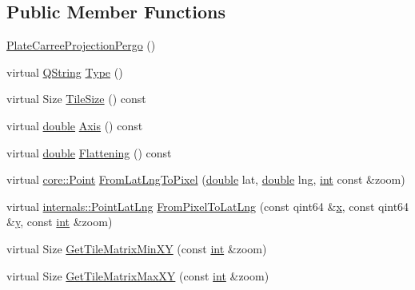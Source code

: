 \subsection*{Public Member Functions}
\begin{DoxyCompactItemize}
\item 
\hyperlink{group___o_p_map_widget_ga9efefe0ffe073b3074b5ada1a6f0f267}{Plate\-Carree\-Projection\-Pergo} ()
\item 
virtual \hyperlink{group___u_a_v_objects_plugin_gab9d252f49c333c94a72f97ce3105a32d}{Q\-String} \hyperlink{group___o_p_map_widget_ga0c0b83ba2e36423002e0561797a75d6f}{Type} ()
\item 
virtual Size \hyperlink{group___o_p_map_widget_ga459271797b70ca4aacc1bc616c8588e1}{Tile\-Size} () const 
\item 
virtual \hyperlink{_super_l_u_support_8h_a8956b2b9f49bf918deed98379d159ca7}{double} \hyperlink{group___o_p_map_widget_ga189bc30528175596e1010dae2d199d1d}{Axis} () const 
\item 
virtual \hyperlink{_super_l_u_support_8h_a8956b2b9f49bf918deed98379d159ca7}{double} \hyperlink{group___o_p_map_widget_ga03c9086ef72e6a349a5ab125cfd6533e}{Flattening} () const 
\item 
virtual \hyperlink{structcore_1_1_point}{core\-::\-Point} \hyperlink{group___o_p_map_widget_gaf785f752ac316a8cb94c96dacabdc244}{From\-Lat\-Lng\-To\-Pixel} (\hyperlink{_super_l_u_support_8h_a8956b2b9f49bf918deed98379d159ca7}{double} lat, \hyperlink{_super_l_u_support_8h_a8956b2b9f49bf918deed98379d159ca7}{double} lng, \hyperlink{ioapi_8h_a787fa3cf048117ba7123753c1e74fcd6}{int} const \&zoom)
\item 
virtual \hyperlink{structinternals_1_1_point_lat_lng}{internals\-::\-Point\-Lat\-Lng} \hyperlink{group___o_p_map_widget_ga3bd1d9693dd54a69baa88bed4785311d}{From\-Pixel\-To\-Lat\-Lng} (const qint64 \&\hyperlink{glext_8h_a1db9d104e3c2128177f26aff7b46982f}{x}, const qint64 \&\hyperlink{glext_8h_a42315f3ed8fff752bb47fd782309fcfc}{y}, const \hyperlink{ioapi_8h_a787fa3cf048117ba7123753c1e74fcd6}{int} \&zoom)
\item 
virtual Size \hyperlink{group___o_p_map_widget_ga95a4e9e98cce1bb7cc3d4afb9e30f1b7}{Get\-Tile\-Matrix\-Min\-X\-Y} (const \hyperlink{ioapi_8h_a787fa3cf048117ba7123753c1e74fcd6}{int} \&zoom)
\item 
virtual Size \hyperlink{group___o_p_map_widget_gabf54183dc66f5385ffa794ce7120629c}{Get\-Tile\-Matrix\-Max\-X\-Y} (const \hyperlink{ioapi_8h_a787fa3cf048117ba7123753c1e74fcd6}{int} \&zoom)
\end{DoxyCompactItemize}
